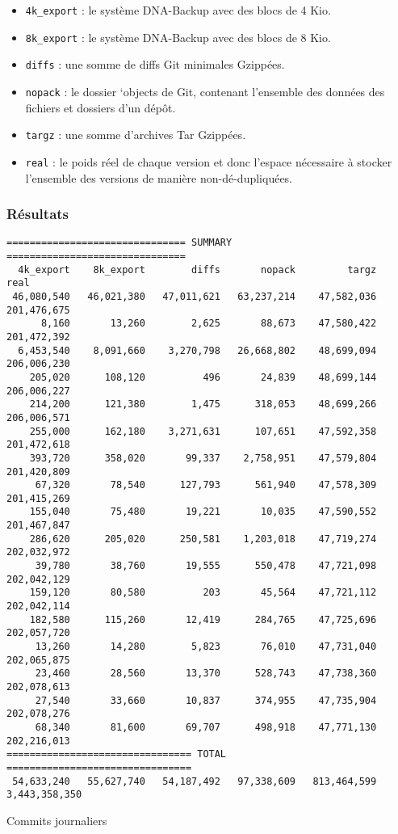 \documentclass[a4paper,twocolumn]{article}
\begin{document}
\begin{itemize}
\item
  \verb|4k_export| : le système DNA-Backup avec des blocs de 4 Kio.
\item
  \verb|8k_export| : le système DNA-Backup avec des blocs de 8 Kio.
\item
  \verb|diffs| : une somme de diffs Git minimales Gzippées.
\item
  \verb|nopack| : le dossier `objects de Git, contenant l'ensemble des
  données des fichiers et dossiers d'un dépôt.
\item
  \verb|targz| : une somme d'archives Tar Gzippées.
\item
  \verb|real| : le poids réel de chaque version et donc l'espace
  nécessaire à stocker l'ensemble des versions de manière
  non-dé-dupliquées.
\end{itemize}

\subsubsection{Résultats}


\begin{table*}[ht]
\begin{verbatim}
=============================== SUMMARY ===============================
  4k_export    8k_export        diffs       nopack         targz           real
 46,080,540   46,021,380   47,011,621   63,237,214    47,582,036    201,476,675
      8,160       13,260        2,625       88,673    47,580,422    201,472,392
  6,453,540    8,091,660    3,270,798   26,668,802    48,699,094    206,006,230
    205,020      108,120          496       24,839    48,699,144    206,006,227
    214,200      121,380        1,475      318,053    48,699,266    206,006,571
    255,000      162,180    3,271,631      107,651    47,592,358    201,472,618
    393,720      358,020       99,337    2,758,951    47,579,804    201,420,809
     67,320       78,540      127,793      561,940    47,578,309    201,415,269
    155,040       75,480       19,221       10,035    47,590,552    201,467,847
    286,620      205,020      250,581    1,203,018    47,719,274    202,032,972
     39,780       38,760       19,555      550,478    47,721,098    202,042,129
    159,120       80,580          203       45,564    47,721,112    202,042,114
    182,580      115,260       12,419      284,765    47,725,696    202,057,720
     13,260       14,280        5,823       76,010    47,731,040    202,065,875
     23,460       28,560       13,370      528,743    47,738,360    202,078,613
     27,540       33,660       10,837      374,955    47,735,904    202,078,276
     68,340       81,600       69,707      498,918    47,771,130    202,216,013
================================ TOTAL ================================
 54,633,240   55,627,740   54,187,492   97,338,609   813,464,599  3,443,358,350
\end{verbatim}
\caption{Commits journaliers}
\label{tab:daily-commits}
\end{table*}
\end{document}
